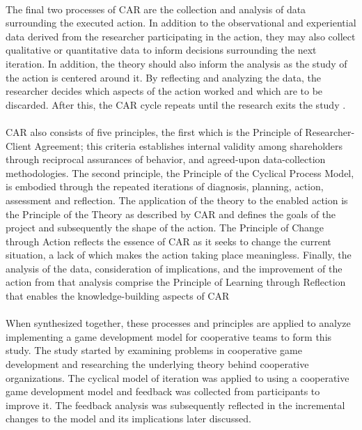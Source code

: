 \paragraph{} The final two processes of CAR are the collection and analysis of data surrounding the executed action. In addition to the observational and experiential data derived from the researcher participating in the action, they may also collect qualitative or quantitative data to inform decisions surrounding the next iteration. In addition, the theory should also inform the analysis as the study of the action is centered around it. By reflecting and analyzing the data, the researcher decides which aspects of the action worked and which are to be discarded. After this, the CAR cycle repeats until the research exits the study \autocite{davison_principles_2004}.

\paragraph{} CAR also consists of five principles, the first which is the Principle of Researcher-Client Agreement; this criteria establishes internal validity among shareholders through reciprocal assurances of behavior, and agreed-upon data-collection methodologies. The second principle, the Principle of the Cyclical Process Model, is embodied through the repeated iterations of diagnosis, planning, action, assessment and reflection. The application of the theory to the enabled action is the Principle of the Theory as described by CAR and defines the goals of the project and subsequently the shape of the action. The Principle of Change through Action reflects the essence of CAR as it seeks to change the current situation, a lack of which makes the action taking place meaningless. Finally, the analysis of the data, consideration of implications, and the improvement of the action from that analysis comprise the Principle of Learning through Reflection that enables the knowledge-building aspects of CAR \autocite{davison_principles_2004} 

\paragraph{} When synthesized together, these processes and principles are applied to analyze implementing a game development model for cooperative teams to form this study. The study started by examining problems in cooperative game development and researching the underlying theory behind cooperative organizations. The cyclical model of iteration was applied to using a cooperative game development model and feedback was collected from participants to improve it. The feedback analysis was subsequently reflected in the incremental changes to the model and its implications later discussed.

